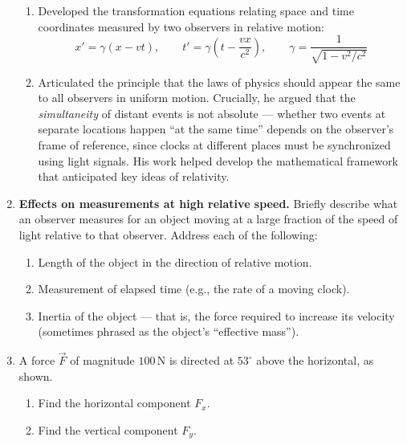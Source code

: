 \documentclass[12pt, twoside]{article}
\begin{document}
\begin{enumerate}
\begin{enumerate}[label=(\alph*), itemsep=0.4cm]
\item Developed the transformation equations relating space and time coordinates measured by two observers in relative motion:
\[
x' = \gamma(x - vt), \qquad t' = \gamma\!\left(t - \dfrac{vx}{c^{2}}\right), \qquad \gamma = \dfrac{1}{\sqrt{1 - v^{2}/c^{2}}}
\]

\item Articulated the principle that the laws of physics should appear the same to all observers in uniform motion. Crucially, he argued that the \emph{simultaneity} of distant events is not absolute --- whether two events at separate locations happen ``at the same time'' depends on the observer's frame of reference, since clocks at different places must be synchronized using light signals. His work helped develop the mathematical framework that anticipated key ideas of relativity.
\end{enumerate}

\newpage

\item \textbf{Effects on measurements at high relative speed.} Briefly describe what an observer measures for an object moving at a large fraction of the speed of light relative to that observer. Address each of the following:
\vspace{0.3cm}
\begin{enumerate}[itemsep=4.5cm]
\item Length of the object in the direction of relative motion.
\item Measurement of elapsed time (e.g., the rate of a moving clock).
\item Inertia of the object --- that is, the force required to increase its velocity (sometimes phrased as the object's ``effective mass'').
\vspace{2cm}
\end{enumerate}

\newpage

\item A force $\vec{F}$ of magnitude $100\,\text{N}$ is directed at $53^\circ$ above the horizontal, as shown.\vspace{0.25cm}
\begin{multicols}{2}
  \begin{enumerate}[itemsep=5cm]
    \item Find the horizontal component $F_x$.
    \item Find the vertical component $F_y$.\vspace{4cm}
  \end{enumerate}
  \begin{flushright}
  \end{flushright}
\end{multicols}


\end{enumerate}
\end{document}
